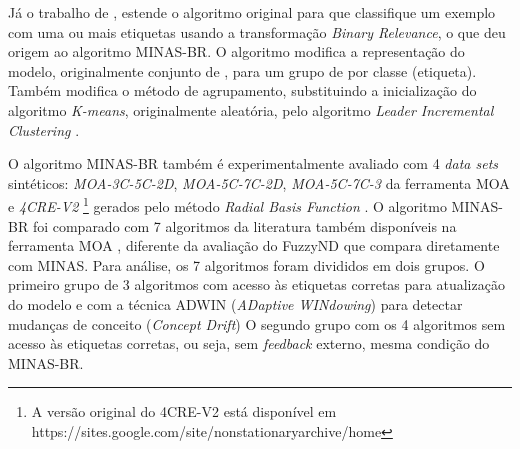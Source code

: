 
Já o trabalho de , estende o algoritmo original para que
classifique um exemplo com uma ou mais etiquetas usando a transformação
\emph{Binary Relevance}, o que deu origem ao algoritmo MINAS-BR.
O algoritmo modifica a representação do modelo, originalmente conjunto de \clusters, para
um grupo de \clusters por classe (etiqueta).
Também modifica o método de agrupamento, substituindo a inicialização do 
algoritmo \emph{K-means}, originalmente aleatória, pelo algoritmo 
\emph{Leader Incremental Clustering} \cite{Vijaya2004505}.


O algoritmo MINAS-BR também é experimentalmente avaliado com 4 \emph{data sets}
sintéticos: \emph{MOA-3C-5C-2D}, \emph{MOA-5C-7C-2D}, \emph{MOA-5C-7C-3} da
ferramenta MOA \cite{MOA} e \emph{4CRE-V2}
\footnote{
    A versão original do \dataset 4CRE-V2 está disponível em 
    https://sites.google.com/site/nonstationaryarchive/home
}
gerados pelo método \emph{Radial Basis Function} \cite{souza2015}.
O algoritmo MINAS-BR foi comparado com 7 algoritmos da literatura também disponíveis na ferramenta
MOA \cite{MOA},
diferente da avaliação do FuzzyND que compara diretamente com MINAS.
Para análise, os 7 algoritmos foram divididos em dois grupos.
O primeiro grupo de 3 algoritmos com acesso às etiquetas corretas para
atualização do modelo e com a técnica ADWIN (\emph{ADaptive WINdowing}) para detectar
mudanças de conceito (\emph{Concept Drift})
O segundo grupo com os 4 algoritmos sem acesso às etiquetas corretas,
ou seja, sem \emph{feedback} externo, mesma condição do MINAS-BR.

